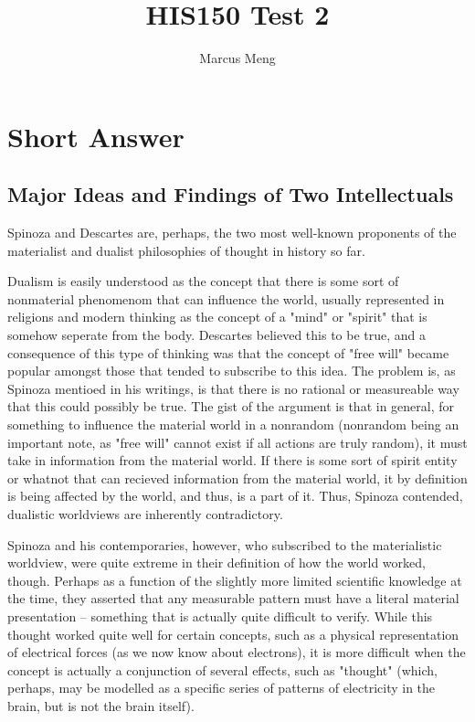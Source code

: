 \documentclass{article}
\title{HIS150 Test 2}
\author{Marcus Meng}
\begin{document}
\maketitle

\section{Short Answer}

\subsection{Major Ideas and Findings of Two Intellectuals}

Spinoza and Descartes are, perhaps, the two most well-known proponents of the materialist and dualist philosophies of thought in history so far.

Dualism is easily understood as the concept that there is some sort of nonmaterial phenomenom that can influence the world, usually represented in religions and modern thinking as the concept of a "mind" or "spirit" that is somehow seperate from the body.
Descartes believed this to be true, and a consequence of this type of thinking was that the concept of "free will" became popular amongst those that tended to subscribe to this idea.
The problem is, as Spinoza mentioed in his writings, is that there is no rational or measureable way that this could possibly be true.
The gist of the argument is that in general, for something to influence the material world in a nonrandom (nonrandom being an important note, as "free will" cannot exist if all actions are truly random), it must take in information from the material world.
If there is some sort of spirit entity or whatnot that can recieved information from the material world, it by definition is being affected by the world, and thus, is a part of it.
Thus, Spinoza contended, dualistic worldviews are inherently contradictory.

Spinoza and his contemporaries, however, who subscribed to the materialistic worldview, were quite extreme in their definition of how the world worked, though.
Perhaps as a function of the slightly more limited scientific knowledge at the time, they asserted that any measurable pattern must have a literal material presentation -- something that is actually quite difficult to verify.
While this thought worked quite well for certain concepts, such as a physical representation of electrical forces (as we now know about electrons), it is more difficult when the concept is actually a conjunction of several effects, such as "thought" (which, perhaps, may be modelled as a specific series of patterns of electricity in the brain, but is not the brain itself).
\end{document}
